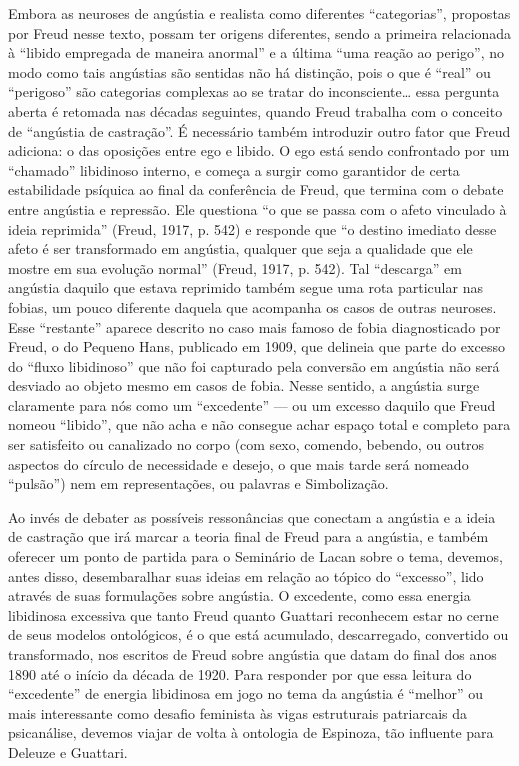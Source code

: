 Embora as neuroses de angústia e realista como diferentes
``categorias'', propostas por Freud nesse texto, possam ter origens
diferentes, sendo a primeira relacionada à ``libido empregada de maneira
anormal'' e a última ``uma reação ao perigo'', no modo como tais
angústias são sentidas não há distinção, pois o que é ``real'' ou
``perigoso'' são categorias complexas ao se tratar do
inconsciente\ldots{} essa pergunta aberta é retomada nas décadas
seguintes, quando Freud trabalha com o conceito de ``angústia de
castração''. É necessário também introduzir outro fator que Freud
adiciona: o das oposições entre ego e libido. O ego está sendo
confrontado por um ``chamado'' libidinoso interno, e começa a surgir
como garantidor de certa estabilidade psíquica ao final da conferência
de Freud, que termina com o debate entre angústia e repressão. Ele
questiona ``o que se passa com o afeto vinculado à ideia reprimida''
(Freud, 1917, p. 542) e responde que ``o destino imediato desse afeto é
ser transformado em angústia, qualquer que seja a qualidade que ele
mostre em sua evolução normal'' (Freud, 1917, p. 542). Tal ``descarga''
em angústia daquilo que estava reprimido também segue uma rota
particular nas fobias, um pouco diferente daquela que acompanha os casos
de outras neuroses. Esse ``restante'' aparece descrito no caso mais
famoso de fobia diagnosticado por Freud, o do Pequeno Hans, publicado em
1909, que delineia que parte do excesso do ``fluxo libidinoso'' que não
foi capturado pela conversão em angústia não será desviado ao objeto
mesmo em casos de fobia. Nesse sentido, a angústia surge claramente para
nós como um ``excedente'' --- ou um excesso daquilo que Freud nomeou
``libido'', que não acha e não consegue achar espaço total e completo
para ser satisfeito ou canalizado no corpo (com sexo, comendo, bebendo,
ou outros aspectos do círculo de necessidade e desejo, o que mais tarde
será nomeado ``pulsão'') nem em representações, ou palavras e
Simbolização.

Ao invés de debater as possíveis ressonâncias que conectam a angústia e
a ideia de castração que irá marcar a teoria final de Freud para a
angústia, e também oferecer um ponto de partida para o Seminário  de
Lacan sobre o tema, devemos, antes disso, desembaralhar suas ideias em
relação ao tópico do ``excesso'', lido através de suas formulações sobre
angústia. O excedente, como essa energia libidinosa excessiva que tanto
Freud quanto Guattari reconhecem estar no cerne de seus modelos
ontológicos, é o que está acumulado, descarregado, convertido ou
transformado, nos escritos de Freud sobre angústia que datam do final
dos anos 1890 até o início da década de 1920. Para responder por que
essa leitura do ``excedente'' de energia libidinosa em jogo no tema da
angústia é ``melhor'' ou mais interessante como desafio feminista às
vigas estruturais patriarcais da psicanálise, devemos viajar de volta à
ontologia de Espinoza, tão influente para Deleuze e Guattari.

